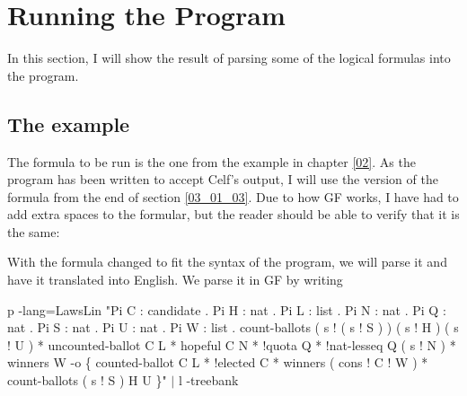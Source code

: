 \section{Running the Program}
\label{04_04}

In this section, I will show the result of parsing some of the logical formulas into the program.

\subsection{The example}

The formula to be run is the one from the example in chapter \ref{02}. As the program has been written to accept Celf's output, I will use the version of the formula from the end of section \ref{03_01_03}. Due to how GF works, I have had to add extra spaces to the formular, but the reader should be able to verify that it is the same:

\begin{textoform}
\end{textoform}

With the formula changed to fit the syntax of the program, we will parse it and have it translated into English. We parse it in GF by writing
\begin{texto2}
p -lang=LawsLin "Pi C : candidate . Pi H : nat . Pi L : list . Pi N : nat . Pi Q : nat . Pi S : nat . Pi U : nat . Pi W : list . count-ballots ( s ! ( s ! S ) ) ( s ! H ) ( s ! U ) * uncounted-ballot C L * hopeful C N * !quota Q * !nat-lesseq Q ( s ! N ) * winners W -o \{ counted-ballot C L * !elected C * winners ( cons ! C ! W ) * count-ballots ( s ! S ) H U \}" $|$ l -treebank
\end{texto2}

